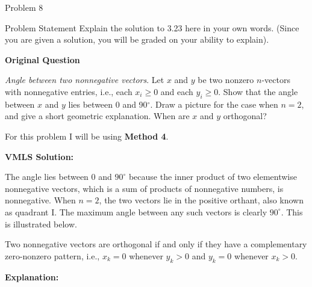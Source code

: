 \begin{problem}{Problem 8}
    \begin{statement}{Problem Statement}
        Explain the solution to 3.23 here in your own words. (Since you are given a solution, you will be graded on your ability to explain). \vspace*{1em}

        \textbf{Original Question} \vspace*{1em}

        \textit{Angle between two nonnegative vectors}. Let $x$ and $y$ be two nonzero $n$-vectors with nonnegative entries, i.e., each $x_{i} \geq 0$ and each $y_{i} \geq 0$. Show that the angle between
        $x$ and $y$ lies between 0 and 90$^{\circ}$. Draw a picture for the case when $n = 2$, and give a short geometric explanation. When are $x$ and $y$ orthogonal?
    \end{statement}

    \begin{highlight}[Solution]
        For this problem I will be using \textbf{Method 4}. \vspace*{1em}

        \textbf{VMLS Solution:} \vspace*{1em}

        The angle lies between 0 and $90^{\circ}$ because the inner product of two elementwise nonnegative vectors, which is a sum of products of nonnegative numbers, is nonnegative. When $n = 2$, the two 
        vectors lie in the positive orthant, also known as quadrant I. The maximum angle between any such vectors is clearly $90^{\circ}$. This is illustrated below.

        \begin{center}
        \end{center}
        Two nonnegative vectors are orthogonal if and only if they have a complementary zero-nonzero pattern, i.e., $x_{k} = 0$ whenever $y_{k} > 0$ and $y_{k} = 0$ whenever $x_{k} > 0$. \vspace*{1em}

        \textbf{Explanation:} \vspace*{1em}


\end{highlight}
\end{problem}
